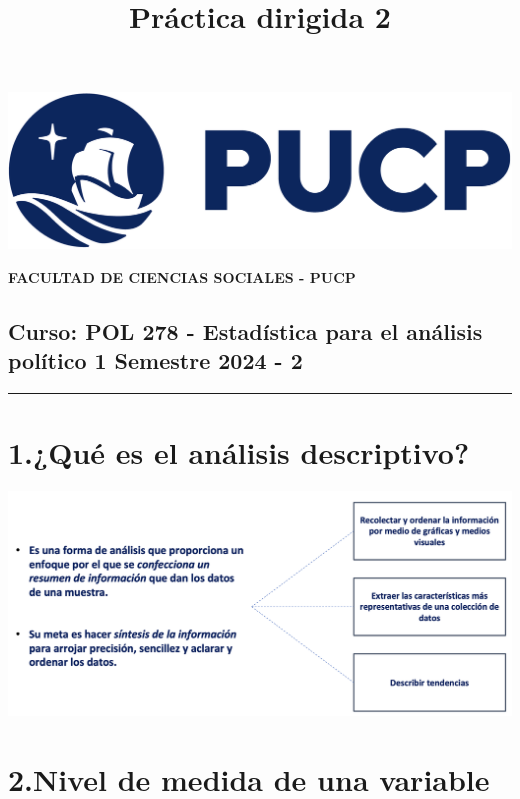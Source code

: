 \documentclass[
]{article}
\title{Práctica dirigida 2}
\author{}
\date{\vspace{-2.5em}}
\begin{document}
\maketitle

{
\setcounter{tocdepth}{4}
\tableofcontents
}
\includegraphics[width=0.3\linewidth]{logoPUCP}

\textbf{FACULTAD DE CIENCIAS SOCIALES - PUCP}

\hypertarget{curso-pol-278---estaduxedstica-para-el-anuxe1lisis-poluxedtico-1-semestre-2024---2}{%
\subsection{\texorpdfstring{Curso: POL 278 - Estadística para el
análisis político 1 \textbar{} Semestre 2024 - 2
}{Curso: POL 278 - Estadística para el análisis político 1 \textbar{} Semestre 2024 - 2  }}\label{curso-pol-278---estaduxedstica-para-el-anuxe1lisis-poluxedtico-1-semestre-2024---2}}

\begin{center}\rule{0.5\linewidth}{0.5pt}\end{center}

\hypertarget{quuxe9-es-el-anuxe1lisis-descriptivo}{%
\section{\texorpdfstring{\textbf{1.¿Qué es el análisis
descriptivo?}}{1.¿Qué es el análisis descriptivo?}}\label{quuxe9-es-el-anuxe1lisis-descriptivo}}

\begin{center}\includegraphics[width=0.8\linewidth]{pd2_QSAnalisisDesc} \end{center}

\hypertarget{nivel-de-medida-de-una-variable}{%
\section{\texorpdfstring{\textbf{2.Nivel de medida de una
variable}}{2.Nivel de medida de una variable}}\label{nivel-de-medida-de-una-variable}}
\end{document}
